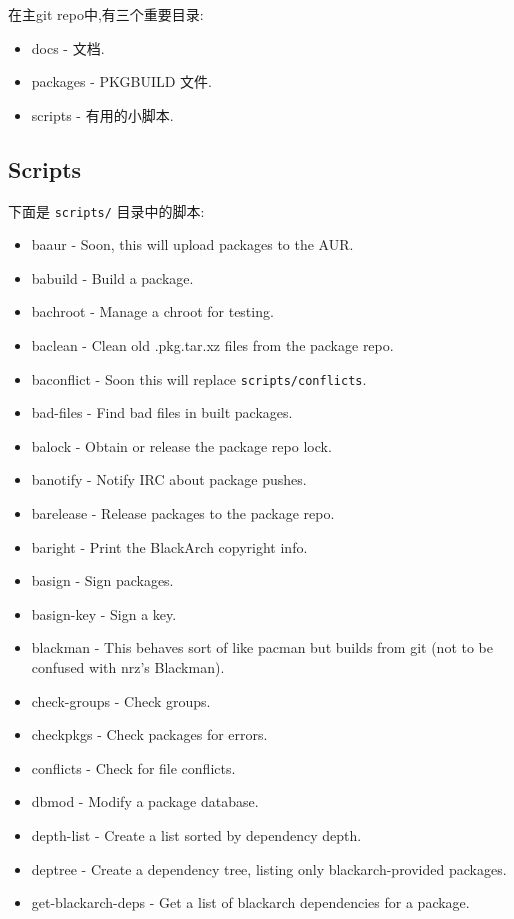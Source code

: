 \documentclass[a4paper, oneside, 11pt]{book}
\begin{document}
在主git repo中,有三个重要目录:

\begin{itemize}
\item docs - 文档.
\item packages - PKGBUILD 文件.
\item scripts - 有用的小脚本.
\end{itemize}

\subsection{Scripts}
下面是 \verb|scripts/| 目录中的脚本:

\begin{itemize}
\item baaur - Soon, this will upload packages to the AUR.
\item babuild - Build a package.
\item bachroot - Manage a chroot for testing.
\item baclean - Clean old .pkg.tar.xz files from the package repo.
\item baconflict - Soon this will replace \verb|scripts/conflicts|.
\item bad-files - Find bad files in built packages.
\item balock - Obtain or release the package repo lock.
\item banotify - Notify IRC about package pushes.
\item barelease - Release packages to the package repo.
\item baright - Print the BlackArch copyright info.
\item basign - Sign packages.
\item basign-key - Sign a key.
\item blackman - This behaves sort of like pacman but builds from git (not to be
    confused with nrz's Blackman).
\item check-groups - Check groups.
\item checkpkgs - Check packages for errors.
\item conflicts - Check for file conflicts.
\item dbmod - Modify a package database.
\item depth-list - Create a list sorted by dependency depth.
\item deptree - Create a dependency tree, listing only blackarch-provided packages.
\item get-blackarch-deps - Get a list of blackarch dependencies for a package.

\end{itemize}
\end{document}

